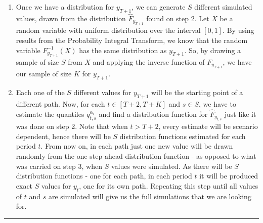 \begin{enumerate}
\item Once we have a distribution for $y_{T+1}$, we can generate $S$ different simulated values, drawn from the distribution $\hat{F}_{y_{T+1}}$ found on step 2. 
Let $X$ be a random variable with uniform distribution over the interval $[0,1]$. By using results from the Probability Integral Transform, we know that the random variable $F^{-1}_{y_{T+1}}(X)$ has the same distribution as $y_{T+1}$. So, by drawing a sample of size $S$ from $X$ and applying the inverse function of $F_{y_{T+1}}$, we have our sample of size $K$ for $y_{T+1}$.

\item Each one of the $S$ different values for $y_{T+1}$ will be the starting point of a different path. Now, for each $t \in [T+2,T+K]$ and $s \in S$, we have to estimate the quantiles $q_{t,s}^{\alpha_i}$ and find a distribution function for $\hat{F}_{y_{t,s}}$ just like it was done on step 2.
Note that when $t > T+2$, every estimate will be scenario dependent, hence there will be $S$ distribution functions estimated for each period $t$. From now on, in each path just one new value will be drawn randomly from the one-step ahead distribution function - as opposed to what was carried on step 3, when $S$ values were simulated. As there will be $S$ distribution functions - one for each path, in each period $t$ it will be produced exact $S$ values for $y_t$, one for its own path. Repeating this step until all values of $t$ and $s$ are simulated will give us the full simulations that we are looking for.
\end{enumerate}


\noindent\rule{\textwidth}{1pt}